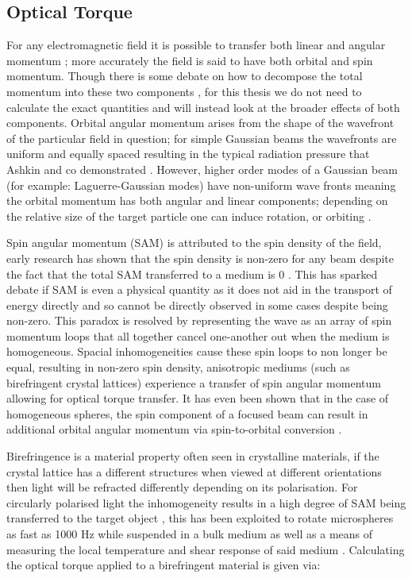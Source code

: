 \subsection{Optical Torque}
For any electromagnetic field it is possible to transfer both linear and 
angular momentum \cite{Beth1936MechanicalDA}; more accurately the field 
is said to have both orbital and spin momentum. Though there is some 
debate on how to decompose the total momentum into these two components 
\cite{Bruce2020, Svak2018}, for this thesis we do not need to calculate 
the exact quantities and will instead look at the broader effects of both 
components. Orbital angular momentum arises from the shape of the wavefront 
of the particular field in question; for simple Gaussian beams the wavefronts 
are uniform and equally spaced resulting in the typical radiation pressure 
that Ashkin and co demonstrated \cite{Ashkin1980}. However, higher order 
modes of a Gaussian beam (for example: Laguerre-Gaussian modes) have 
non-uniform wave fronts meaning the orbital momentum has both angular and
linear components; depending on the relative size of the target particle 
one can induce rotation, or orbiting \cite{Bruce2020, Courtial2000}. 

Spin angular momentum (SAM) is attributed to the spin density of the field, 
early research has shown that the spin density is non-zero for any beam despite
the fact that the total SAM transferred to a medium is 0 \cite{Svak2018, 
Bliokh2014}. This has sparked debate if SAM is even a physical quantity as 
it does not aid in the transport of energy directly \cite{Bliokh2014} and 
so cannot be directly observed in some cases despite being non-zero. This 
paradox is resolved by representing the wave as an array of spin momentum 
loops that all together cancel one-another out when the medium is homogeneous.
Spacial inhomogeneities cause these spin loops to non longer be equal, resulting
in non-zero spin density, anisotropic mediums (such as birefringent crystal 
lattices) experience a transfer of spin angular momentum allowing for optical
torque transfer. It has even been shown that in the case of homogeneous spheres, 
the spin component of a focused beam can result in additional orbital angular
momentum via spin-to-orbital conversion \cite{Yevick2017}. 

Birefringence is a material property often seen in crystalline materials, 
if the crystal lattice has a different structures when viewed at different 
orientations then light will be refracted differently depending on its 
polarisation. For circularly polarised light the inhomogeneity results in 
a high degree of SAM being transferred to the target object \cite{Parkin2009,
Arita2016}, this has been exploited to rotate microspheres as fast as 1000 Hz 
while suspended in a bulk medium \cite{Arita2016} as well as a means of 
measuring the local temperature and shear response of said medium 
\cite{Millen2014, RodriguezSevilla2018}. Calculating the optical torque 
applied to a birefringent material is given via:

